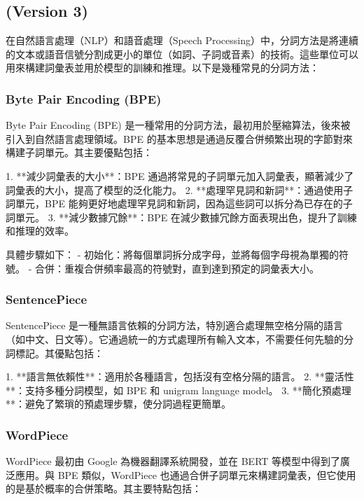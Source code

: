 
\myhline
\subsection{(Version 3)}

在自然語言處理（NLP）和語音處理（Speech Processing）中，分詞方法是將連續的文本或語音信號分割成更小的單位（如詞、子詞或音素）的技術。這些單位可以用來構建詞彙表並用於模型的訓練和推理。以下是幾種常見的分詞方法：

\subsubsection{Byte Pair Encoding (BPE)}

Byte Pair Encoding (BPE) 是一種常用的分詞方法，最初用於壓縮算法，後來被引入到自然語言處理領域。BPE 的基本思想是通過反覆合併頻繁出現的字節對來構建子詞單元。其主要優點包括：

1. **減少詞彙表的大小**：BPE 通過將常見的子詞單元加入詞彙表，顯著減少了詞彙表的大小，提高了模型的泛化能力。
2. **處理罕見詞和新詞**：通過使用子詞單元，BPE 能夠更好地處理罕見詞和新詞，因為這些詞可以拆分為已存在的子詞單元。
3. **減少數據冗餘**：BPE 在減少數據冗餘方面表現出色，提升了訓練和推理的效率。

具體步驟如下：
- 初始化：將每個單詞拆分成字母，並將每個字母視為單獨的符號。
- 合併：重複合併頻率最高的符號對，直到達到預定的詞彙表大小。

\subsubsection{SentencePiece}

SentencePiece 是一種無語言依賴的分詞方法，特別適合處理無空格分隔的語言（如中文、日文等）。它通過統一的方式處理所有輸入文本，不需要任何先驗的分詞標記。其優點包括：

1. **語言無依賴性**：適用於各種語言，包括沒有空格分隔的語言。
2. **靈活性**：支持多種分詞模型，如 BPE 和 unigram language model。
3. **簡化預處理**：避免了繁瑣的預處理步驟，使分詞過程更簡單。

\subsubsection{WordPiece}

WordPiece 最初由 Google 為機器翻譯系統開發，並在 BERT 等模型中得到了廣泛應用。與 BPE 類似，WordPiece 也通過合併子詞單元來構建詞彙表，但它使用的是基於概率的合併策略。其主要特點包括：

